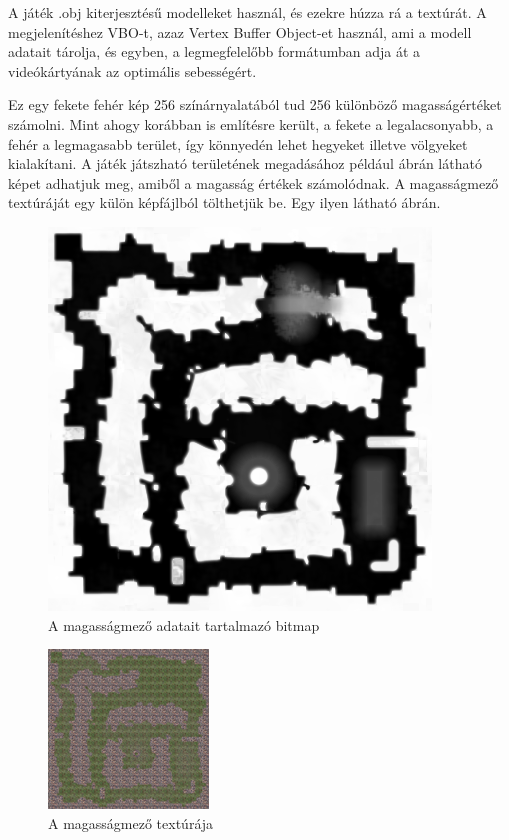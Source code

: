 A játék .obj kiterjesztésű modelleket használ, és ezekre húzza rá a textúrát. A megjelenítéshez VBO-t, azaz Vertex Buffer Object-et használ, ami a modell adatait tárolja, és egyben, a legmegfelelőbb formátumban adja át a videókártyának az optimális sebességért.

Ez egy fekete fehér kép 256 színárnyalatából tud 256 különböző magasságértéket számolni. Mint ahogy korábban is említésre került, a fekete a legalacsonyabb, a fehér a legmagasabb terület, így könnyedén lehet hegyeket illetve völgyeket kialakítani. A játék játszható területének megadásához például  ábrán látható képet adhatjuk meg, amiből a magasság értékek számolódnak. A magasságmező textúráját egy külön képfájlból tölthetjük be. Egy ilyen látható  ábrán.

\begin{figure}[h]
\centering
\includegraphics[scale=0.5]{kepek/heightmap.png}
\caption{A magasságmező adatait tartalmazó bitmap}
\label{fig:heightmap}
\end{figure}

\begin{figure}[h]
\centering
\includegraphics[scale=1.5]{kepek/heightmap_texture.png}
\caption{A magasságmező textúrája}
\label{fig:heightmap_texture}
\end{figure}

